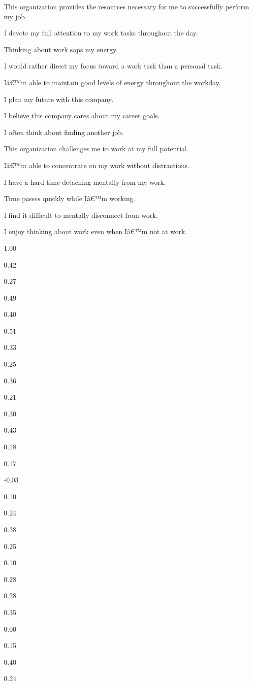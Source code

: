 \documentclass[
]{book}
\begin{document}
This organization provides the resources necessary for me to successfully perform my job.

I devote my full attention to my work tasks throughout the day.

Thinking about work saps my energy.

I would rather direct my focus toward a work task than a personal task.

Iâ€™m able to maintain good levels of energy throughout the workday.

I plan my future with this company.

I believe this company cares about my career goals.

I often think about finding another job.

This organization challenges me to work at my full potential.

Iâ€™m able to concentrate on my work without distractions.

I have a hard time detaching mentally from my work.

Time passes quickly while Iâ€™m working.

I find it difficult to mentally disconnect from work.

I enjoy thinking about work even when Iâ€™m not at work.

1.00

0.42

0.27

0.49

0.40

0.51

0.33

0.25

0.36

0.21

0.30

0.43

0.18

0.17

-0.03

0.10

0.24

0.38

0.25

0.10

0.28

0.28

0.35

0.00

0.15

0.40

0.24
\end{document}
